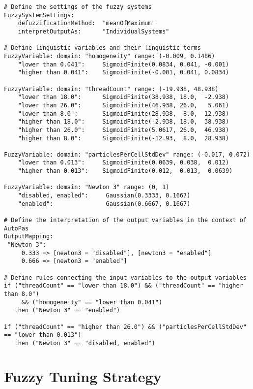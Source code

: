 \begin{lstlisting}[caption={Demonstration of the domain-specific language used for Fuzzy Tuning},label={lst:rulefile},language=FuzzyLanguage]
# Define the settings of the fuzzy systems
FuzzySystemSettings:
    defuzzificationMethod:  "meanOfMaximum"
    interpretOutputAs:      "IndividualSystems"

# Define linguistic variables and their linguistic terms
FuzzyVariable: domain: "homogeneity" range: (-0.009, 0.1486)
    "lower than 0.041":     SigmoidFinite(0.0834, 0.041, -0.001)
    "higher than 0.041":    SigmoidFinite(-0.001, 0.041, 0.0834)

FuzzyVariable: domain: "threadCount" range: (-19.938, 48.938)
    "lower than 18.0":      SigmoidFinite(38.938, 18.0,  -2.938)
    "lower than 26.0":      SigmoidFinite(46.938, 26.0,   5.061)
    "lower than 8.0":       SigmoidFinite(28.938,  8.0, -12.938)
    "higher than 18.0":     SigmoidFinite(-2.938, 18.0,  38.938)
    "higher than 26.0":     SigmoidFinite(5.0617, 26.0,  46.938)
    "higher than 8.0":      SigmoidFinite(-12.93,  8.0,  28.938)
     
FuzzyVariable: domain: "particlesPerCellStdDev" range: (-0.017, 0.072)
    "lower than 0.013":     SigmoidFinite(0.0639, 0.038,  0.012)
    "higher than 0.013":    SigmoidFinite(0.012,  0.013,  0.0639)
  
FuzzyVariable: domain: "Newton 3" range: (0, 1)
    "disabled, enabled":     Gaussian(0.3333, 0.1667)
    "enabled":               Gaussian(0.6667, 0.1667)
      
# Define the interpretation of the output variables in the context of AutoPas
OutputMapping:
 "Newton 3":
     0.333 => [newton3 = "disabled"], [newton3 = "enabled"]
     0.666 => [newton3 = "enabled"]

# Define rules connecting the input variables to the output variables
if ("threadCount" == "lower than 18.0") && ("threadCount" == "higher than 8.0") 
     && ("homogeneity" == "lower than 0.041")
   then ("Newton 3" == "enabled")

if ("threadCount" == "higher than 26.0") && ("particlesPerCellStdDev" == "lower than 0.013")
   then ("Newton 3" == "disabled, enabled")
\end{lstlisting}



\section{Fuzzy Tuning Strategy}


